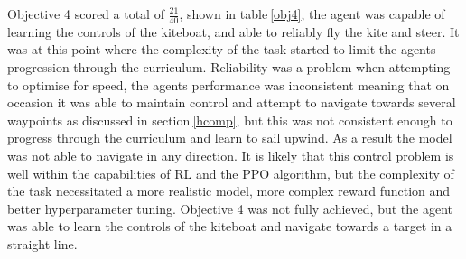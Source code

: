 \begin{table}[!htb]
    \centering
    \caption{Objective 4 Evaluation}\label{obj4}
\end{table}
Objective 4 scored a total of $\frac{21}{40}$, shown in table$~$\ref{obj4}, the agent was capable of learning the controls of the kiteboat, and able to reliably fly the kite and steer. It was at this point where the complexity of the task started to limit the agents progression through the curriculum. Reliability was a problem when attempting to optimise for speed, the agents performance was inconsistent meaning that on occasion it was able to maintain control and attempt to navigate towards several waypoints as discussed in section$~$\ref{hcomp}, but this was not consistent enough to progress through the curriculum and learn to sail upwind. As a result the model was not able to navigate in any direction. It is likely that this control problem is well within the capabilities of RL and the PPO algorithm, but the complexity of the task necessitated a more realistic model, more complex reward function and better hyperparameter tuning. Objective 4 was not fully achieved, but the agent was able to learn the controls of the kiteboat and navigate towards a target in a straight line.  

